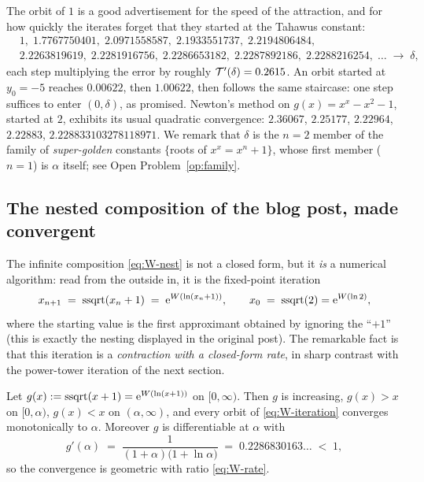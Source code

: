 The orbit of $1$ is a good advertisement for the speed of the
attraction, and for how quickly the iterates forget that they started
at the Tahawus constant:
\[
\begin{aligned}
    &1,\; 1.7767750401,\; 2.0971558587,\; 2.1933551737,\;
    2.2194806484,\\
    &2.2263819619,\; 2.2281916756,\; 2.2286653182,\;
    2.2287892186,\; 2.2288216254,\;\ldots\;\to\;\delta,
\end{aligned}
\]
each step multiplying the error by roughly $\mathcal{T}'(\delta) = 0.2615$.
An orbit started at $y_{0} = -5$ reaches $0.00622$, then $1.00622$,
then follows the same staircase: one step suffices to enter
$(0,\delta)$, as promised. Newton's method on
$g(x) = x^{x} - x^{2} - 1$, started at $2$, exhibits its usual
quadratic convergence:
$2.36067$, $2.25177$, $2.22964$, $2.22883$, $2.228833103278118971$.
We remark that $\delta$ is the $n = 2$ member of the family of
\emph{super-golden} constants $\{$roots of $x^{x} = x^{n} + 1\}$,
whose first member ($n = 1$) is $\alpha$ itself; see Open
Problem~\ref{op:family}.

\subsection{The nested composition of the blog post, made convergent}
\label{subsec:W-iteration}

The infinite composition \eqref{eq:W-nest} is not a closed form, but
it \emph{is} a numerical algorithm: read from the outside in, it is
the fixed-point iteration
\begin{equation}\label{eq:W-iteration}
    x_{n+1} \;=\; \operatorname{ssqrt}(x_{n} + 1) \;=\; \mathrm{e}^{W(\ln(x_{n}+1))},
    \qquad x_{0} \;=\; \operatorname{ssqrt}(2) = \mathrm{e}^{W(\ln 2)},
\end{equation}
where the starting value is the first approximant obtained by ignoring
the ``$+1$'' (this is exactly the nesting displayed in the original
post). The remarkable fact is that this iteration is a
\emph{contraction with a closed-form rate}, in sharp contrast with the
power-tower iteration of the next section.

\begin{proposition}
\label{prop:W-iteration}
Let $g(x) := \operatorname{ssqrt}(x+1) = \mathrm{e}^{W(\ln(x+1))}$ on $[0,\infty)$. Then
$g$ is increasing, $g(x) > x$ on $[0, \alpha)$, $g(x) < x$ on
$(\alpha, \infty)$, and every orbit of \eqref{eq:W-iteration}
converges monotonically to $\alpha$. Moreover $g$ is differentiable at
$\alpha$ with
\begin{equation}\label{eq:W-rate}
    g'(\alpha) \;=\; \frac{1}{(1 + \alpha)\bigl(1 + \ln \alpha\bigr)}
    \;=\; 0.2286830163\ldots \;<\; 1 ,
\end{equation}
so the convergence is geometric with ratio \eqref{eq:W-rate}.
\end{proposition}

